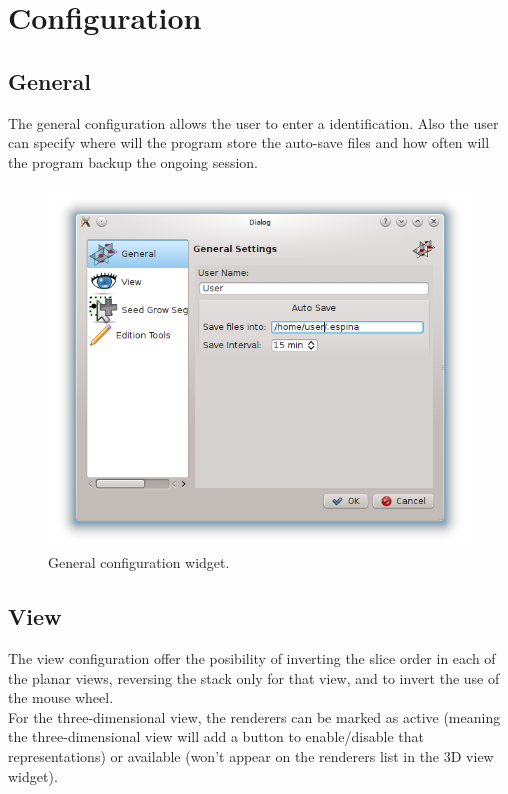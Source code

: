 \section{Configuration}

\subsection{General}

The general configuration allows the user to enter a identification. Also the user can
specify where will the program store the auto-save files and how often will the program
backup the ongoing session.

\begin{figure}[H]
\centering
\includegraphics[scale=0.75]{fig/Configuration-general}
\caption{General configuration widget.}
\end{figure}

\subsection{View}

The view configuration offer the posibility of inverting the slice order in each of the
planar views, reversing the stack only for that view, and to invert the use of the mouse
wheel. \\
For the three-dimensional view, the renderers can be marked as active (meaning the
three-dimensional view will add a button to enable/disable that representations) or available
(won't appear on the renderers list in the 3D view widget).
\vspace{0.3cm}

